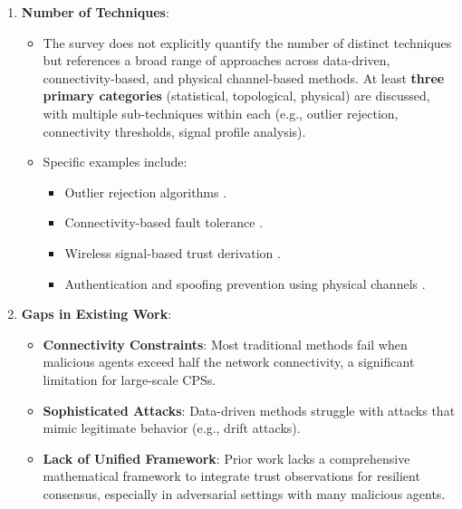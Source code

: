 \documentclass{article}
\begin{document}
\begin{enumerate}
    \item \textbf{Number of Techniques}:
    \begin{itemize}
        \item The survey does not explicitly quantify the number of distinct techniques but references a broad range of approaches across data-driven, connectivity-based, and physical channel-based methods. At least \textbf{three primary categories} (statistical, topological, physical) are discussed, with multiple sub-techniques within each (e.g., outlier rejection, connectivity thresholds, signal profile analysis).
        \item Specific examples include:
        \begin{itemize}
            \item Outlier rejection algorithms \cite{ref8}.
            \item Connectivity-based fault tolerance \cite{ref1}.
            \item Wireless signal-based trust derivation \cite{ref20,ref49,ref54}.
            \item Authentication and spoofing prevention using physical channels \cite{ref19,ref51,ref53}.
        \end{itemize}
    \end{itemize}
    
    \item \textbf{Gaps in Existing Work}:
    \begin{itemize}
        \item \textbf{Connectivity Constraints}: Most traditional methods fail when malicious agents exceed half the network connectivity, a significant limitation for large-scale CPSs.
        \item \textbf{Sophisticated Attacks}: Data-driven methods struggle with attacks that mimic legitimate behavior (e.g., drift attacks).
        \item \textbf{Lack of Unified Framework}: Prior work lacks a comprehensive mathematical framework to integrate trust observations for resilient consensus, especially in adversarial settings with many malicious agents.
    \end{itemize}
\end{enumerate}
\end{document}
